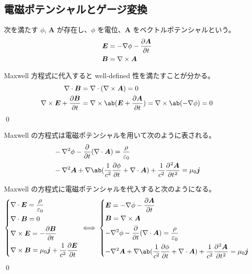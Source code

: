 \documentclass[uplatex,dvipdfmx,a4paper,11pt]{jlreq}
\makeatletter
\newcommand{\EE}{\bm{E}}
\newcommand{\BB}{\bm{B}}
\renewcommand{\AA}{\bm{A}}
\newcommand{\vnabla}{\mathbf{\nabla}}
\newcommand{\laplacian}{\nabla^2}
\numberwithin{equation}{section}
\theoremstyle{definition}
\renewenvironment{proof}[1][\proofname]{\par
  \normalfont
  \topsep6\p@\@plus6\p@ \trivlist
  \item[\hskip\labelsep{\bfseries #1}\@addpunct{\bfseries}]\ignorespaces\quad\par
}{%
  \qed\endtrivlist\@endpefalse
}
\renewcommand\proofname{証明}
\makeatother
\begin{document}
\subsection{電磁ポテンシャルとゲージ変換}
\begin{definition}[電磁ポテンシャル]
  次を満たす $\phi$, $\AA$ が存在し、$\phi$ を電位、$\AA$ をベクトルポテンシャルという。
  \begin{align}
    \EE & = - \vnabla\phi - \diffp{\AA}{t} \\
    \BB & = \vnabla\times\AA
  \end{align}
\end{definition}
\begin{proof}
  Maxwell 方程式に代入すると well-defined 性を満たすことが分かる。
  \begin{align}
    \vnabla\cdot\BB                   & = \vnabla\cdot(\vnabla\times\AA) = 0                                          \\
    \vnabla\times\EE + \diffp{\BB}{t} & = \vnabla\times\ab(\EE + \diffp{\AA}{t}) = \vnabla\times\ab(-\vnabla\phi) = 0
  \end{align}
\end{proof}

\begin{theorem}
  Maxwell の方程式は電磁ポテンシャルを用いて次のように表される。
  \begin{align}
     & -\laplacian\phi - \diffp{}{t}(\vnabla\cdot\AA) = \frac{\rho}{\varepsilon_0}                                                \\
     & -\laplacian\AA + \vnabla\ab(\frac{1}{c^2}\diffp{\phi}{t} + \vnabla\cdot\AA) + \frac{1}{c^2}\diffp[2]{\AA}{t} = \mu_0\bm{j}
  \end{align}
\end{theorem}
\begin{proof}
  Maxwell の方程式に電磁ポテンシャルを代入すると次のようになる。
  \begin{align}
    \begin{dcases}
      \vnabla\cdot\EE  = \frac{\rho}{\varepsilon_0} \\
      \vnabla\cdot\BB  = 0                          \\
      \vnabla\times\EE = -\diffp{\BB}{t}            \\
      \vnabla\times\BB = \mu_0\bm{j} + \frac{1}{c^2}\diffp{\EE}{t}
    \end{dcases}
    \iff
    \begin{dcases}
      \EE = - \vnabla\phi - \diffp{\AA}{t}                                        \\
      \BB = \vnabla\times\AA                                                      \\
      -\laplacian\phi - \diffp{}{t}(\vnabla\cdot\AA) = \frac{\rho}{\varepsilon_0} \\
      -\laplacian\AA + \vnabla\ab(\frac{1}{c^2}\diffp{\phi}{t} + \vnabla\cdot\AA) + \frac{1}{c^2}\diffp[2]{\AA}{t} = \mu_0\bm{j}
    \end{dcases}
  \end{align}
\end{proof}
\end{document}
